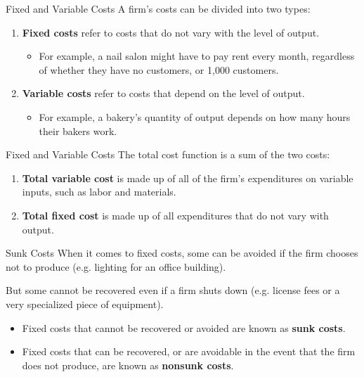 \documentclass[11pt,t]{beamer}
\begin{document}
\begin{frame}{Fixed and Variable Costs}
  A firm's costs can be divided into two types:

  \begin{enumerate}
    \item \textbf{Fixed costs} refer to costs that do not vary with the level of output.
    
    \begin{itemize}
      \item For example, a nail salon might have to pay rent every month, regardless of whether they have no customers, or 1,000 customers.
    \end{itemize}
    
    \item \textbf{Variable costs} refer to costs that depend on the level of output.
  
    \begin{itemize}
      \item For example, a bakery's quantity of output depends on how many hours their bakers work.
    \end{itemize}
  \end{enumerate}
\end{frame}

\begin{frame}{Fixed and Variable Costs}
  The total cost function is a sum of the two costs:
  
  \begin{enumerate}
    \item \textbf{Total variable cost} is made up of all of the firm's expenditures on variable inputs, such as labor and materials.
    \item \textbf{Total fixed cost} is made up of all expenditures that do not vary with output.
  \end{enumerate}
\end{frame}

\begin{frame}{Sunk Costs}
  When it comes to fixed costs, some can be avoided if the firm chooses not to produce (e.g. lighting for an office building).

  \bigskip
  But some cannot be recovered even if a firm shuts down (e.g. license fees or a very specialized piece of equipment).

  \begin{itemize}
    \item Fixed costs that cannot be recovered or avoided are known as \textbf{sunk costs}.
  
    \item Fixed costs that can be recovered, or are avoidable in the event that the firm does not produce, are known as \textbf{nonsunk costs}.
  \end{itemize}
\end{frame}
\end{document}
